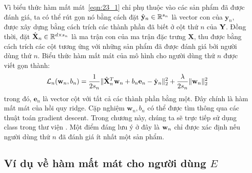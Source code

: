 Vì biểu thức hàm mất mát~\eqref{eqn:23_1} chỉ phụ thuộc vào các sản phẩm đã
được đánh giá, ta có thể rút gọn nó bằng cách đặt $\hat{\mathbf{y}}_n \in
\mathbb{R}^{s_n}$ là
{vector con} của $\mathbf{y}_n$, được xây dựng bằng cách {trích}
các
thành phần đã biết ở cột thứ $n$ của $\mathbf{Y}$. Đồng thời, đặt
$\hat{\mathbf{X}}_n \in \mathbb{R}^{d\times s_n}$ là {ma trận con} của ma trận
đặc trưng $\mathbf{X}$, thu được bằng cách {trích} các cột tương ứng với
những sản phẩm đã được đánh giá bởi người dùng thứ $n$. Biểu thức hàm mất mát của mô hình cho người dùng thứ $n$ được viết gọn thành:
\begin{equation}
\mathcal{L}_n(\mathbf{w}_n, b_n) = \frac{1}{2s_n}
\|\hat{\mathbf{X}}_n^T\mathbf{w}_n + b_n
\mathbf{e}_n- \hat{\mathbf{y}}_n\|_2^2 + \frac{\lambda}{2s_n} \|\mathbf{w}_n\|_2^2
\end{equation}
trong đó, $\mathbf{e}_n$ là vector cột với tất cả các thành phần bằng một.
Đây {chính} là hàm mất mát của hồi quy ridge. Cặp nghiệm
$\mathbf{w}_n, b_n$ có thể được tìm thông qua các thuật toán gradient
descent. Trong chương này, chúng ta sẽ trực tiếp sử dụng class
 trong thư viện . Một
điểm đáng lưu ý ở đây là $\mathbf{w}_n$ chỉ được xác định nếu người dùng thứ $n$ đã
đánh giá ít nhất một sản phẩm.



\subsection{Ví dụ về hàm mất mát cho người dùng $E$ }


